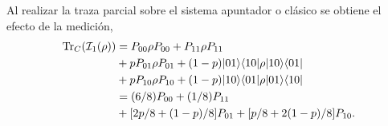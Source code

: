 Al realizar la traza parcial sobre el sistema apuntador o clásico se obtiene el efecto de la medición, \begin{equation}\label{traza_A1_ejemplo1}
    \begin{split}
        {\rm Tr}_C(\mathcal{I}_1(\rho)) &= P_{00} \rho P_{00} + P_{11}\rho P_{11}\\
        &+p P_{01}\rho P_{01}+(1-p) |01\rangle \langle 10|\rho|10\rangle \langle01|\\
        &+p P_{10}\rho P_{10}+(1-p) |10\rangle \langle 01|\rho|01\rangle \langle10|\\
        &=(6/8)P_{00} + (1/8)P_{11}\\
        &+[2p/8 +(1-p)/8]P_{01}+ [p/8+2(1-p)/8]P_{10}.\\
    \end{split}
\end{equation}
\begin{comment} %
Para la segunda alternativa se procede de forma parecida sin embargo el efecto de la medición es diferente, \begin{equation}\label{segunda_alternativa_ejemplo1}
    \begin{split}
        \mathcal{I}_2(\rho)&=\sum_{j,k}\mathcal{F}(P_{a_j,b_k})\otimes P_{a_j,b_k} \rho P_{a_j,b_k}\\
        &=P_{00}\otimes P_{00} \la 00|\rho|00\ra + P_{11}\otimes P_{11} \la 11|\rho|11\ra\\
        &+P_{01} \otimes [pP_{01} \la 01|\rho|01\ra+(1-p)P_{10}\la 10|\rho|10\ra]\\
        &+P_{10} \otimes [p P_{10}\la 10|\rho|10\ra+(1-p)P_{01}\la 01|\rho|01\ra]\\
        &=P_{00}\otimes (6/8)P_{00} + P_{11}\otimes (1/8)P_{11}\\
        &+   P_{01} \otimes [2p/8P_{01} +(1-p)/8P_{10}]+P_{10} \otimes[p/8 P_{10}+2(1-p)/8 P_{01}].\\
    \end{split}
\end{equation}


De nuevo, al realizar la traza parcial sobre le sistema cuántico se obtendrá la probabilidad de cada una de las salidas posibles \begin{equation}\label{traza_S2_ejemplo1}
    \begin{split}
        \tr_Q(\mathcal{I}_2(\rho)) &= P_{00} \la 00|\rho|00\ra + P_{11} \la 11|\rho|11\ra\\
        &+P_{01}[p \la 01|\rho|01\ra+(1-p)\la 10|\rho|10\ra]\\
        &+P_{10}[p \la 10|\rho|10\ra+(1-p)\la 01|\rho|01\ra]\\
        &=(6/8)P_{00} + (1/8)P_{11}\\
        &+[2p/8 +(1-p)/8]P_{01}+ [p/8+2(1-p)/8]P_{10}.\\
    \end{split}
\end{equation}


\end{comment}
